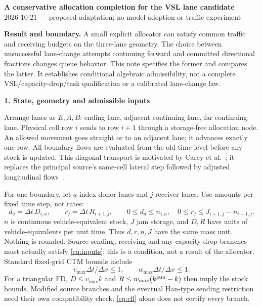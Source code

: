 \documentclass[10pt,a4paper]{article}
\newcommand{\head}[1]{\par\medskip\textbf{#1}\par}
\begin{document}
\begin{center}
{\large\bfseries A conservative allocation completion for the VSL lane candidate}\\[3pt]
2026-10-21 --- proposed adaptation; no model adoption or traffic experiment
\end{center}

\textbf{Result and boundary.} A small explicit allocator can satisfy common
traffic and receiving budgets on the three-lane geometry. The choice between
unsuccessful lane-change attempts continuing forward and committed directional
fractions changes queue behavior. This note specifies the former and compares
the latter. It establishes conditional algebraic admissibility, not a complete
VSL/capacity-drop/task qualification or a calibrated lane-change law.

\head{1. State, geometry and admissible inputs}
Arrange lanes as $E,A,B$: ending lane, adjacent continuing lane, far continuing
lane. Physical cell row $i$ sends to row $i+1$ through a storage-free allocation
node. An allowed movement goes straight or to an adjacent lane; it advances
exactly one row. All boundary flows are evaluated from the old time level
before any stock is updated. This diagonal transport is motivated by Carey
et al.~\cite{carey}; it replaces the principal source's same-cell lateral step
followed by adjusted longitudinal flows~\cite{subraveti}.

For one boundary, let $a$ index donor lanes and $j$ receiver lanes. Use amounts
per fixed time step, not rates:
\begin{equation}
 d_a=\Delta t\,D_{i,a},\qquad r_j=\Delta t\,R_{i+1,j},\qquad
 0\leq d_a\leq n_{i,a},\quad
 0\leq r_j\leq J_{i+1,j}-n_{i+1,j}. \label{eq:inputs}
\end{equation}
$n$ is continuous vehicle-equivalent stock, $J$ jam storage, and $D,R$ have
units of vehicle-equivalents per unit time. Thus $d,r,n,J$ have the same mass
unit. Nothing is rounded. Source sending, receiving and any capacity-drop
branches must actually satisfy \eqref{eq:inputs}; this is a condition, not a
result of the allocator. Standard fixed-grid CTM bounds include
\begin{equation}
 v_{\max}\Delta t/\Delta x\leq1,\qquad
 w_{\max}\Delta t/\Delta x\leq1. \label{eq:cfl}
\end{equation}
For a triangular FD, $D\leq v_{\max}k$ and
$R\leq w_{\max}(k^{\rm jam}-k)$ then imply the stock bounds. Modified source
branches and the eventual Han-type sending restriction~\cite{han} need their
own compatibility check; \eqref{eq:cfl} alone does not certify every branch.
\end{document}

